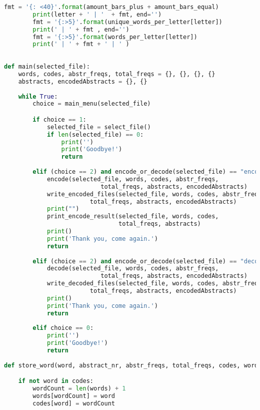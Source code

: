 \documentclass{article}
\begin{document}
\begin{lstlisting}[language=Python]
        fmt = '{: <40}'.format(amount_bars_plus + amount_bars_equal)
        print(letter + ' | '  + fmt, end='')
        fmt = '{:>5}'.format(unique_words_per_letter[letter])                   # this makes the histogram orginized and places spaces if there are no + or = to place
        print(' | ' + fmt , end='')
        fmt = '{:>5}'.format(words_per_letter[letter])
        print(' | ' + fmt + ' | ' )
        
        
def main(selected_file):
    words, codes, abstr_freqs, total_freqs = {}, {}, {}, {}
    abstracts, encodedAbstracts = {}, {}
    
    while True:
        choice = main_menu(selected_file)                           

        if choice == 1:
            selected_file = select_file()
            if len(selected_file) == 0:
                print('')
                print('Goodbye!')
                return
     
        elif (choice == 2) and encode_or_decode(selected_file) == "encode":
            encode(selected_file, words, codes, abstr_freqs,
                           total_freqs, abstracts, encodedAbstracts)
            write_encoded_files(selected_file, words, codes, abstr_freqs,
                        total_freqs, abstracts, encodedAbstracts)
            print("")
            print_encode_result(selected_file, words, codes, 
                                total_freqs, abstracts)
            print()
            print('Thank you, come again.')
            return
     
        elif (choice == 2) and encode_or_decode(selected_file) == "decode" :
            decode(selected_file, words, codes, abstr_freqs,
                           total_freqs, abstracts, encodedAbstracts)
            write_decoded_files(selected_file, words, codes, abstr_freqs,
                        total_freqs, abstracts, encodedAbstracts)
            print()
            print('Thank you, come again.')
            return
    
        elif choice == 0:
            print('')
            print('Goodbye!')
            return
    
def store_word(word, abstract_nr, abstr_freqs, total_freqs, codes, words): #this stores a word in the coded file, if a word isn't seen yet is creates a new key and value and if it is already seen it adds one to the value

    if not word in codes:
        wordCount = len(words) + 1
        words[wordCount] = word
        codes[word] = wordCount


\end{lstlisting}
\end{document}
